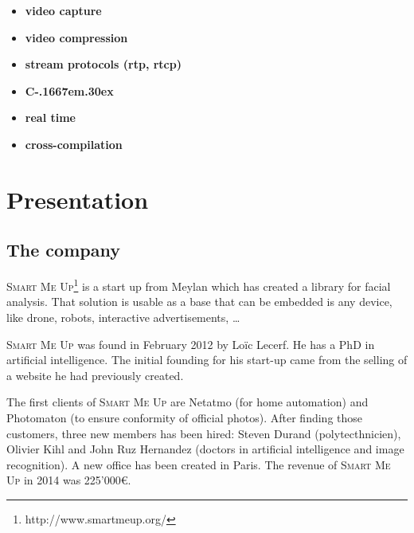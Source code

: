\documentclass[a4paper,11pt]{custom}
\newcommand{\smu}{\textsc{Smart Me Up}\xspace}
\newcommand{\cpp}{%
  C\kern-.1667em\raise.30ex\hbox{\smaller{++}}%
  \spacefactor1000\xspace%
}
\begin{document}
\begin{multicols}{2}
\begin{itemize}
\item \textbf{video capture}
\item \textbf{video compression}
\item \textbf{stream protocols (rtp, rtcp)}
\item \textbf{\cpp}
\item \textbf{real time}
\item \textbf{cross-compilation}
\end{itemize}
\end{multicols}

\newpage

%
\headerleftcontent{\headerlefttext}%
\headerrightcontent{\headerrighttext}%

\tableofcontents

\clearpage

\chapter{Presentation}


\section{The company}

\smu{}\footnote{http://www.smartmeup.org/} is a start up from Meylan which has
created a library for facial
analysis. That solution is usable as a base that can be embedded is any device,
like drone, robots, interactive advertisements, …

\smu{} was found in February 2012 by Loïc Lecerf. He has a PhD in artificial
intelligence. The initial founding for his start-up came from the selling of
a website he had previously created.

The first clients of \smu{} are Netatmo (for home automation) and Photomaton (to
ensure conformity of official photos). After finding those customers, three new
members has been hired: Steven Durand (polytecthnicien), Olivier Kihl and John
Ruz Hernandez (doctors in artificial intelligence and image recognition). A new
office has been created in Paris. The revenue of \smu{} in 2014 was 225'000\euro.
\end{document}
